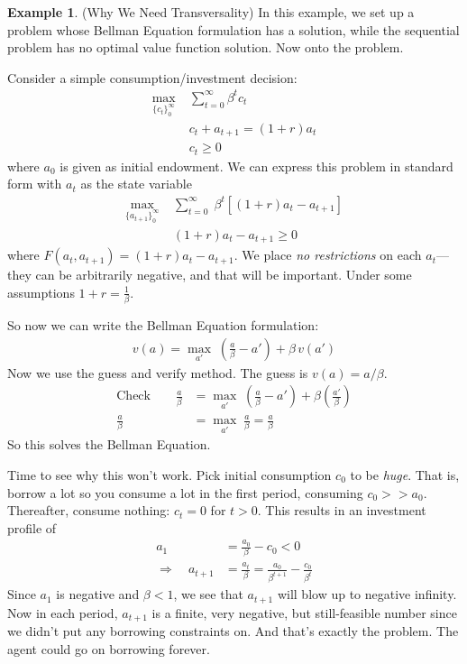 \documentclass[12pt]{article}
\numberwithin{equation}{section} %
\theoremstyle{plain}
\theoremstyle{definition}
\newtheorem{ex}[thm]{Example}
\theoremstyle{remark}
\newcommand{\sumtinfz}{\sum^\infty_{t=0}}
\begin{document}
\begin{ex}{(Why We Need Transversality)}
In this example, we set up a problem whose Bellman Equation formulation
has a solution, while the sequential problem has no optimal value
function solution. Now onto the problem.

Consider a simple consumption/investment decision:
\begin{align*}
  \max_{\{c_t\}_0^\infty} \; &\sumtinfz \beta^t c_t \\
  & c_t + a_{t+1} = (1+r)a_t\\
  & c_t \geq 0
\end{align*}
where $a_0$ is given as initial endowment. We can express this problem
in standard form with $a_t$ as the state variable
\begin{align*}
  \max_{\{a_{t+1}\}_0^\infty} \;
  &\sumtinfz \; \beta^t [(1+r)a_t - a_{t+1}] \\
  & (1+r)a_t - a_{t+1} \geq 0
\end{align*}
where $F(a_t,a_{t+1}) = (1+r)a_t - a_{t+1}$.
We place \emph{no restrictions} on each $a_t$---they can be arbitrarily
negative, and that will be important.
Under some assumptions $1+r = \frac{1}{\beta}$.

So now we can write the Bellman Equation formulation:
\begin{align*}
  v(a) = \max_{a'} \; \left(\frac{a}{\beta} - a'\right) + \beta \, v(a')
\end{align*}
Now we use the guess and verify method. The guess is $v(a) = a/\beta$.
\begin{align*}
  \text{Check} \qquad
  \frac{a}{\beta}
  &= \max_{a'} \;
  \left(\frac{a}{\beta} - a'\right)
  + \beta \left(\frac{a'}{\beta}\right)\\
  \frac{a}{\beta}
  &= \max_{a'} \;
  \frac{a}{\beta}
  =
  \frac{a}{\beta}
\end{align*}
So this solves the Bellman Equation.

Time to see why this won't work. Pick initial consumption $c_0$ to be
\emph{huge}. That is, borrow a lot so you consume a lot in the first
period, consuming $c_0 >> a_0$.
Thereafter, consume nothing: $c_t=0$ for $t>0$. This results in an
investment profile of
\begin{align*}
  a_{1} &= \frac{a_0}{\beta} - c_0 < 0 \\
  \Rightarrow \quad
  a_{t+1} &= \frac{a_t}{\beta}
  = \frac{a_0}{\beta^{t+1}} - \frac{c_0}{\beta^t}
\end{align*}
Since $a_1$ is negative and $\beta<1$, we see that $a_{t+1}$ will blow
up to negative infinity.
Now in each period, $a_{t+1}$ is a finite, very negative, but
still-feasible number since we didn't put any borrowing constraints on.
And that's exactly the problem. The agent could go on borrowing forever.


\end{ex}
\end{document}

